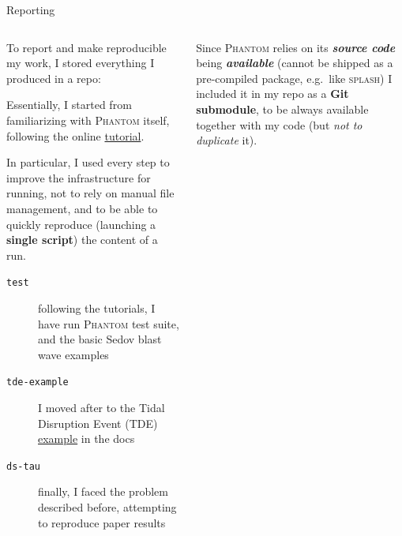\documentclass[9pt]{beamer}
\renewcommand{\phantom}{\textsc{Phantom}\xspace}
\newcommand{\splash}{\textsc{splash}\xspace}
\begin{document}
\begin{frame}{Reporting}
    \begin{columns}
        \begin{column}{0.5\textwidth}
            To report and make reproducible my work, I stored everything I
            produced in a repo:
            \begin{center}
            \end{center}

            Essentially, I started from familiarizing with \phantom itself,
            following the online
            \href{https://phantomsph.readthedocs.io/en/latest/getting-started.html}{tutorial}.
            \vspace*{15pt}

            In particular, I used every step to improve the infrastructure for
            running, not to rely on manual file management, and to be able to
            quickly reproduce (launching a \textbf{single script}) the content
            of a run.
            \vspace*{5pt}

            \begin{description}
                \item[\texttt{test}] following the tutorials, I have run \phantom test
                    suite, and the basic Sedov blast wave examples
                \item[\texttt{tde-example}] I moved after to the Tidal
                    Disruption Event (TDE)
                    \href{https://phantomsph.readthedocs.io/en/latest/star.html}{example}
                    in the docs
                \item[\texttt{ds-tau}] finally, I faced the problem described
                    before, attempting to reproduce paper results
            \end{description}
        \end{column}
        \begin{column}{0.5\textwidth}
            \vspace*{15pt}

            Since \phantom relies on its \textit{\textbf{source code}} being
            \textit{\textbf{available}} (cannot be shipped as a pre-compiled
            package, e.g.\ like \splash) I included it in my repo as a
            \textbf{Git submodule}, to be always available together with my
            code (but \textit{not to duplicate} it).
            \vspace*{5pt}


\end{column}
\end{columns}
\end{frame}
\end{document}
